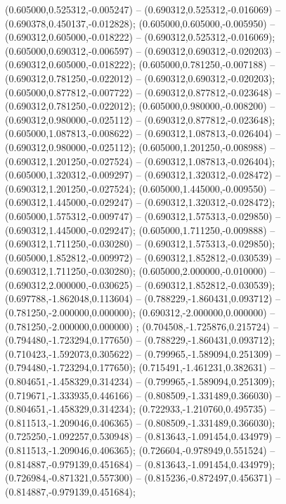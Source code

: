  (0.605000,0.525312,-0.005247) -- (0.690312,0.525312,-0.016069) -- (0.690378,0.450137,-0.012828);
 (0.605000,0.605000,-0.005950) -- (0.690312,0.605000,-0.018222) -- (0.690312,0.525312,-0.016069);
 (0.605000,0.690312,-0.006597) -- (0.690312,0.690312,-0.020203) -- (0.690312,0.605000,-0.018222);
 (0.605000,0.781250,-0.007188) -- (0.690312,0.781250,-0.022012) -- (0.690312,0.690312,-0.020203);
 (0.605000,0.877812,-0.007722) -- (0.690312,0.877812,-0.023648) -- (0.690312,0.781250,-0.022012);
 (0.605000,0.980000,-0.008200) -- (0.690312,0.980000,-0.025112) -- (0.690312,0.877812,-0.023648);
 (0.605000,1.087813,-0.008622) -- (0.690312,1.087813,-0.026404) -- (0.690312,0.980000,-0.025112);
 (0.605000,1.201250,-0.008988) -- (0.690312,1.201250,-0.027524) -- (0.690312,1.087813,-0.026404);
 (0.605000,1.320312,-0.009297) -- (0.690312,1.320312,-0.028472) -- (0.690312,1.201250,-0.027524);
 (0.605000,1.445000,-0.009550) -- (0.690312,1.445000,-0.029247) -- (0.690312,1.320312,-0.028472);
 (0.605000,1.575312,-0.009747) -- (0.690312,1.575313,-0.029850) -- (0.690312,1.445000,-0.029247);
 (0.605000,1.711250,-0.009888) -- (0.690312,1.711250,-0.030280) -- (0.690312,1.575313,-0.029850);
 (0.605000,1.852812,-0.009972) -- (0.690312,1.852812,-0.030539) -- (0.690312,1.711250,-0.030280);
 (0.605000,2.000000,-0.010000) -- (0.690312,2.000000,-0.030625) -- (0.690312,1.852812,-0.030539);
 (0.697788,-1.862048,0.113604) -- (0.788229,-1.860431,0.093712) -- (0.781250,-2.000000,0.000000);
 (0.690312,-2.000000,0.000000) -- (0.781250,-2.000000,0.000000) ;
 (0.704508,-1.725876,0.215724) -- (0.794480,-1.723294,0.177650) -- (0.788229,-1.860431,0.093712);
 (0.710423,-1.592073,0.305622) -- (0.799965,-1.589094,0.251309) -- (0.794480,-1.723294,0.177650);
 (0.715491,-1.461231,0.382631) -- (0.804651,-1.458329,0.314234) -- (0.799965,-1.589094,0.251309);
 (0.719671,-1.333935,0.446166) -- (0.808509,-1.331489,0.366030) -- (0.804651,-1.458329,0.314234);
 (0.722933,-1.210760,0.495735) -- (0.811513,-1.209046,0.406365) -- (0.808509,-1.331489,0.366030);
 (0.725250,-1.092257,0.530948) -- (0.813643,-1.091454,0.434979) -- (0.811513,-1.209046,0.406365);
 (0.726604,-0.978949,0.551524) -- (0.814887,-0.979139,0.451684) -- (0.813643,-1.091454,0.434979);
 (0.726984,-0.871321,0.557300) -- (0.815236,-0.872497,0.456371) -- (0.814887,-0.979139,0.451684);
